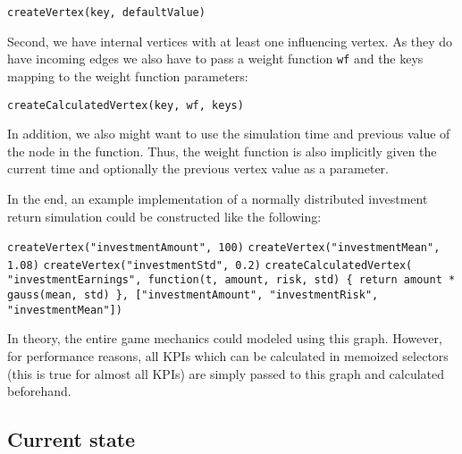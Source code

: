 \begin{center}
	\texttt{createVertex(key, defaultValue)}
\end{center}

Second, we have internal vertices with at least one influencing vertex. As they do have incoming edges we also have to pass a weight function \texttt{wf} and the keys mapping to the weight function parameters:
\begin{center}
	\texttt{createCalculatedVertex(key, wf, keys)}
\end{center}
 
 In addition, we also might want to use the simulation time and previous value of the node in the function. Thus, the weight function is also implicitly given the current time and optionally the previous vertex value as a parameter.
 
 
 In the end, an example implementation of a normally distributed investment return simulation could be constructed like the following:\\
 
 \begin{algorithmic}[1]
 	\STATE \texttt{createVertex("investmentAmount", 100)}
    \STATE \texttt{createVertex("investmentMean", 1.08)}
    \STATE \texttt{createVertex("investmentStd", 0.2)}
	\STATE \texttt{createCalculatedVertex(\newline \hspace*{1mm} "investmentEarnings",\newline \hspace*{2mm} function(t, amount, risk, std) \{ \newline \hspace*{10mm}return amount * gauss(mean, std)  \newline \hspace*{2mm} \},\newline \hspace*{2mm} ["investmentAmount", "investmentRisk", "investmentMean"]\newline )}    
  \end{algorithmic}
  \vspace{1cm}
  In theory, the entire game mechanics could modeled using this graph. However, for performance reasons, all KPIs which can be calculated in memoized selectors (this is true for almost all KPIs) are simply passed to this graph and calculated beforehand.
  
  \subsection{Current state}
  \label{sub:currentState}
  
